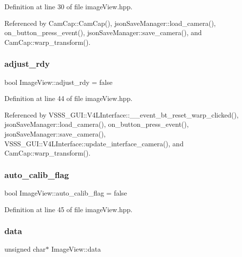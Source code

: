Definition at line 30 of file image\+View.\+hpp.



Referenced by Cam\+Cap\+::\+Cam\+Cap(), json\+Save\+Manager\+::load\+\_\+camera(), on\+\_\+button\+\_\+press\+\_\+event(), json\+Save\+Manager\+::save\+\_\+camera(), and Cam\+Cap\+::warp\+\_\+transform().

\mbox{\label{class_image_view_a9a73e324dd284f7b6b33b760b9a21c33}} 
\subsubsection{\texorpdfstring{adjust\+\_\+rdy}{adjust\_rdy}}
{\footnotesize\ttfamily bool Image\+View\+::adjust\+\_\+rdy = false}



Definition at line 44 of file image\+View.\+hpp.



Referenced by V\+S\+S\+S\+\_\+\+G\+U\+I\+::\+V4\+L\+Interface\+::\+\_\+\+\_\+event\+\_\+bt\+\_\+reset\+\_\+warp\+\_\+clicked(), json\+Save\+Manager\+::load\+\_\+camera(), on\+\_\+button\+\_\+press\+\_\+event(), json\+Save\+Manager\+::save\+\_\+camera(), V\+S\+S\+S\+\_\+\+G\+U\+I\+::\+V4\+L\+Interface\+::update\+\_\+interface\+\_\+camera(), and Cam\+Cap\+::warp\+\_\+transform().

\mbox{\label{class_image_view_af9ca8bbc458a3cbd3838113637606806}} 
\subsubsection{\texorpdfstring{auto\+\_\+calib\+\_\+flag}{auto\_calib\_flag}}
{\footnotesize\ttfamily bool Image\+View\+::auto\+\_\+calib\+\_\+flag = false}



Definition at line 45 of file image\+View.\+hpp.

\mbox{\label{class_image_view_aafc2f72cb5d3cbc5f23eb303b30982da}} 
\subsubsection{\texorpdfstring{data}{data}}
{\footnotesize\ttfamily unsigned char$\ast$ Image\+View\+::data}



